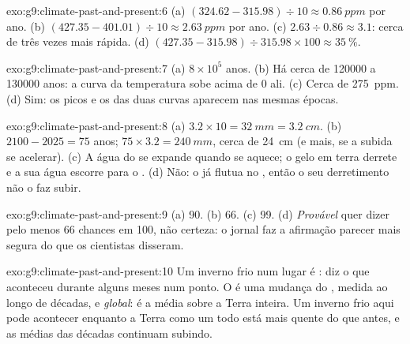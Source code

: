 \begin{solution}{exo:g9:climate-past-and-present:6}
(a) $(324.62 - 315.98) \div 10 \approx \qty{0.86}{ppm}$ por ano. (b)
$(427.35 - 401.01) \div 10 \approx \qty{2.63}{ppm}$ por ano. (c) $2.63
\div 0.86 \approx 3.1$: cerca de três vezes mais rápida. (d) $(427.35 - 315.98)
\div 315.98 \times 100 \approx 35~\%$.
\end{solution}

\begin{solution}{exo:g9:climate-past-and-present:7}
(a) $8 \times 10^5$ anos. (b) Há cerca de \num{120000} a \num{130000}
anos: a curva da temperatura sobe acima de 0 ali. (c) Cerca de
\qty{275}{ppm}. (d) Sim: os picos e os  das duas curvas aparecem nas
mesmas épocas.
\end{solution}

\begin{solution}{exo:g9:climate-past-and-present:8}
(a) $3.2 \times 10 = \qty{32}{mm} = \qty{3.2}{cm}$. (b) $2100 - 2025 =
75$ anos; $75 \times 3.2 = \qty{240}{mm}$, cerca de \qty{24}{cm} (e mais,
se a subida se acelerar). (c) A água do  se expande quando se aquece;
o gelo em terra derrete e a sua água escorre para o . (d) Não: o  já flutua no , então o seu derretimento não o faz subir.
\end{solution}

\begin{solution}{exo:g9:climate-past-and-present:9}
(a) 90. (b) 66. (c) 99. (d) \emph{Provável} quer dizer pelo menos 66
chances em 100, não certeza: o jornal faz a afirmação parecer mais segura
do que os cientistas disseram.
\end{solution}

\begin{solution}{exo:g9:climate-past-and-present:10}
Um inverno frio num lugar é \emph{}: diz o que aconteceu durante
alguns meses num ponto. O  é uma mudança do
\emph{}, medida ao longo de décadas, e \emph{global}: é a média
sobre a Terra inteira. Um inverno frio aqui pode acontecer enquanto a
Terra como um todo está mais quente do que antes, e as médias das
décadas continuam subindo.
\end{solution}

